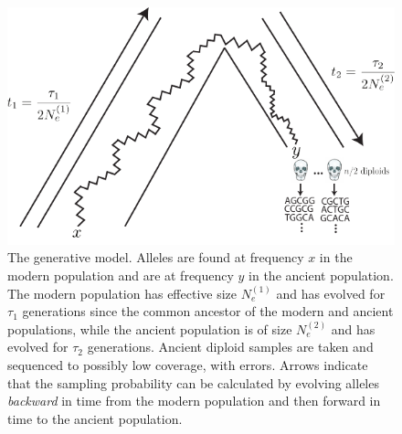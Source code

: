 \documentclass[11pt, oneside]{article}   	%
\begin{document}
\begin{figure}[!h] %
   \centering
   \includegraphics[width=.9\textwidth]{backward_forward_v2.pdf} 
	\caption{The generative model. Alleles are found at frequency $x$ in the modern population and are at frequency $y$ in the ancient population. The modern population has effective size $N_e^{(1)}$ and has evolved for $\tau_1$ generations since the common ancestor of the modern and ancient populations, while the ancient population is of size $N_e^{(2)}$ and has evolved for $\tau_2$ generations. Ancient diploid samples are taken and sequenced to possibly low coverage, with errors. Arrows indicate that the sampling probability can be calculated by evolving alleles \emph{backward} in time from the modern population and then forward in time to the ancient population.}
	\label{generative_model}
\end{figure}
\end{document}

